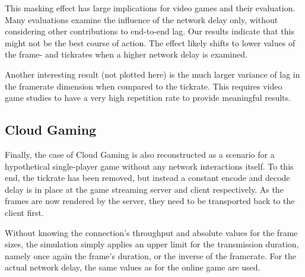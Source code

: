This masking effect has large implications for video games and their evaluation. Many evaluations examine the influence of the network delay only, without considering other contributions to end-to-end lag. Our results indicate that this might not be the best course of action. The effect likely shifts to lower values of the frame- and tickrates when a higher network delay is examined.

Another interesting result (not plotted here) is the much larger 
variance of lag in the framerate dimension when compared to the 
tickrate. This requires video game studies %
to have a very high repetition rate to %
provide meaningful results.


\subsection{Cloud Gaming}

Finally, the case of Cloud Gaming is also reconstructed as a scenario for a hypothetical single-player game without any network interactions itself. To this end, the tickrate has been removed, but instead a constant encode and decode delay is in place at the game streaming server and client respectively. As the frames are now rendered by the server, they need to be transported back to the client first. 

Without knowing the connection's throughput and absolute values for the frame sizes, the simulation simply applies an upper limit for the transmission duration, namely once again the frame's duration, or the inverse of the framerate. For the actual network delay, the same values as for the online game are used.

